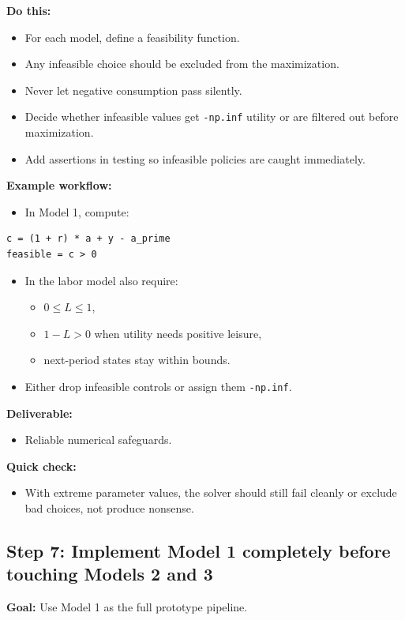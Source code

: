 \documentclass[11pt]{article}
\begin{document}
\textbf{Do this:}
\begin{itemize}
    \item For each model, define a feasibility function.
    \item Any infeasible choice should be excluded from the maximization.
    \item Never let negative consumption pass silently.
    \item Decide whether infeasible values get \verb|-np.inf| utility or are filtered out before maximization.
    \item Add assertions in testing so infeasible policies are caught immediately.
\end{itemize}

\textbf{Example workflow:}
\begin{itemize}
    \item In Model 1, compute:
\end{itemize}
\begin{lstlisting}
c = (1 + r) * a + y - a_prime
feasible = c > 0
\end{lstlisting}
\begin{itemize}
    \item In the labor model also require:
    \begin{itemize}
        \item \(0 \leq L \leq 1\),
        \item \(1-L > 0\) when utility needs positive leisure,
        \item next-period states stay within bounds.
    \end{itemize}
    \item Either drop infeasible controls or assign them \verb|-np.inf|.
\end{itemize}

\textbf{Deliverable:}
\begin{itemize}
    \item Reliable numerical safeguards.
\end{itemize}

\textbf{Quick check:}
\begin{itemize}
    \item With extreme parameter values, the solver should still fail cleanly or exclude bad choices, not produce nonsense.
\end{itemize}

\subsection{Step 7: Implement Model 1 completely before touching Models 2 and 3}
\textbf{Goal:} Use Model 1 as the full prototype pipeline.
\end{document}
